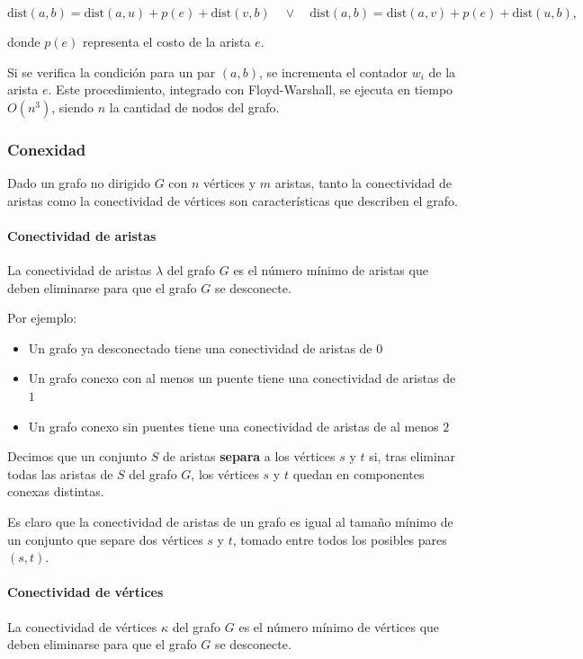 \documentclass[a4paper]{article}
\begin{document}
\[
\text{dist}(a, b) = \text{dist}(a, u) + p(e) + \text{dist}(v, b) \quad \lor \quad \text{dist}(a, b) = \text{dist}(a, v) + p(e) + \text{dist}(u, b),
\]

donde \(p(e)\) representa el costo de la arista \(e\).

Si se verifica la condición para un par \((a, b)\), se incrementa el contador \(w_i\) de la arista \(e\). Este procedimiento, integrado con Floyd-Warshall, se ejecuta en tiempo \(O(n^3)\), siendo \(n\) la cantidad de nodos del grafo.


\subsubsection{Conexidad}

Dado un grafo no dirigido \(G\) con \(n\) vértices y \(m\) aristas, tanto la conectividad de aristas como la conectividad de vértices son características que describen el grafo.

\paragraph{Conectividad de aristas}
La conectividad de aristas \(\lambda\) del grafo \(G\) es el número mínimo de aristas que deben eliminarse para que el grafo \(G\) se desconecte.

Por ejemplo:
\begin{itemize}
    \item Un grafo ya desconectado tiene una conectividad de aristas de \(0\)
    \item Un grafo conexo con al menos un puente tiene una conectividad de aristas de \(1\)
    \item Un grafo conexo sin puentes tiene una conectividad de aristas de al menos \(2\)
\end{itemize}

Decimos que un conjunto \(S\) de aristas \textbf{separa} a los vértices \(s\) y \(t\) si, tras eliminar todas las aristas de \(S\) del grafo \(G\), los vértices \(s\) y \(t\) quedan en componentes conexas distintas.

Es claro que la conectividad de aristas de un grafo es igual al tamaño mínimo de un conjunto que separe dos vértices \(s\) y \(t\), tomado entre todos los posibles pares \((s, t)\).

\paragraph{Conectividad de vértices}
La conectividad de vértices \(\kappa\) del grafo \(G\) es el número mínimo de vértices que deben eliminarse para que el grafo \(G\) se desconecte.
\end{document}
